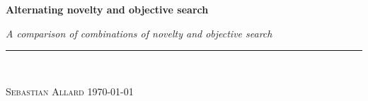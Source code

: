 
\vspace*{5cm}

\begin{flushleft}
\Huge \textsf{\textbf{Alternating novelty and objective search}}
\end{flushleft}

\emph{\large A comparison of combinations of novelty and objective search} \hfill \\
\rule{\textwidth}{1pt} \\

\begin{flushright}
\textsc{Sebastian Allard} \quad \today
\end{flushright}


\thispagestyle{empty}
